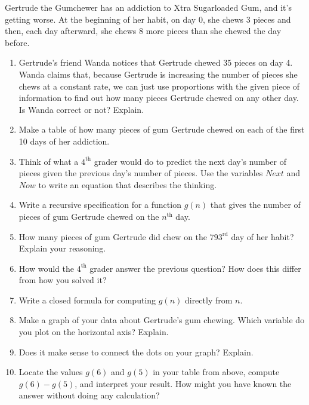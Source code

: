 \begin{prob}%
Gertrude the Gumchewer has an addiction to Xtra Sugarloaded Gum, and it's getting worse.  At the beginning of her habit, on day 0, she chews 3 pieces and then, each day afterward, she chews 8 more pieces than she chewed the day before.
\begin{enumerate}
\item Gertrude's friend Wanda notices that Gertrude chewed 35 pieces on day 4.  Wanda claims that, because Gertrude is increasing the number of pieces she chews at a constant rate, we can just use proportions with the given piece of information to find out how many pieces Gertrude chewed on any other day.  Is Wanda correct or not?  Explain. 
\item Make a table of how many pieces of gum Gertrude chewed on each of the first 10 days of her addiction.  
\item Think of what a $4^\mathrm{th}$ grader would do to predict the next day's number of pieces given the previous day's number of pieces.  Use the variables $Next$ and $Now$ to write an equation that describes the thinking.
\item Write a recursive specification for a function $g(n)$ that gives the number of pieces of gum Gertrude chewed on the $n^\mathrm{th}$ day.  
\item How many pieces of gum Gertrude did chew on the $793^\mathrm{rd}$ day of her habit?  Explain your reasoning.  
\item How would the $4^\mathrm{th}$ grader answer the previous question?  How does this differ from how you solved it?
\item Write a closed formula for computing $g(n)$ directly from $n$.  
\item Make a graph of your data about Gertrude's gum chewing.  Which variable do you plot on the horizontal axis?  Explain.  
\item Does it make sense to connect the dots on your graph?  Explain.  
\item  Locate the values $g(6)$ and $g(5)$ in your table from above, compute  $g(6) - g(5)$, and interpret your result.  How might you have known the answer without doing any calculation?  
\end{enumerate}
\end{prob}

